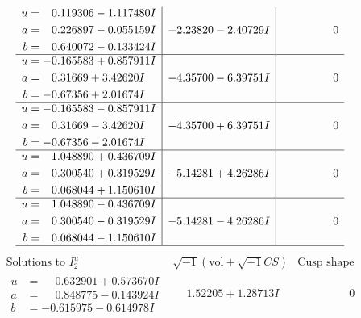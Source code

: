 \documentclass[1p]{elsarticle_modified}
\theoremstyle{definition}
\newcommand{\I}{\sqrt{-1}}
\begin{document}
$$\begin{array}{c|c|c}
\begin{aligned}
u &= \phantom{-}0.119306 - 1.117480 I \\
a &= \phantom{-}0.226897 - 0.055159 I \\
b &= \phantom{-}0.640072 - 0.133424 I\end{aligned}
 & -2.23820 - 2.40729 I & \phantom{-0.000000 } 0 \\ \hline\begin{aligned}
u &= -0.165583 + 0.857911 I \\
a &= \phantom{-}0.31669 + 3.42620 I \\
b &= -0.67356 + 2.01674 I\end{aligned}
 & -4.35700 - 6.39751 I & \phantom{-0.000000 } 0 \\ \hline\begin{aligned}
u &= -0.165583 - 0.857911 I \\
a &= \phantom{-}0.31669 - 3.42620 I \\
b &= -0.67356 - 2.01674 I\end{aligned}
 & -4.35700 + 6.39751 I & \phantom{-0.000000 } 0 \\ \hline\begin{aligned}
u &= \phantom{-}1.048890 + 0.436709 I \\
a &= \phantom{-}0.300540 + 0.319529 I \\
b &= \phantom{-}0.068044 + 1.150610 I\end{aligned}
 & -5.14281 + 4.26286 I & \phantom{-0.000000 } 0 \\ \hline\begin{aligned}
u &= \phantom{-}1.048890 - 0.436709 I \\
a &= \phantom{-}0.300540 - 0.319529 I \\
b &= \phantom{-}0.068044 - 1.150610 I\end{aligned}
 & -5.14281 - 4.26286 I & \phantom{-0.000000 } 0\\
 \hline 
 \end{array}$$\newpage$$\begin{array}{c|c|c}  
\text{Solutions to }I^u_{2}& \I (\text{vol} + \sqrt{-1}CS) & \text{Cusp shape}\\
 \hline 
\begin{aligned}
u &= \phantom{-}0.632901 + 0.573670 I \\
a &= \phantom{-}0.848775 - 0.143924 I \\
b &= -0.615975 - 0.614978 I\end{aligned}
 & \phantom{-}1.52205 + 1.28713 I & \phantom{-0.000000 } 0 \\ \hline\begin{aligned}

\end{aligned}
\end{array}$$
\end{document}
